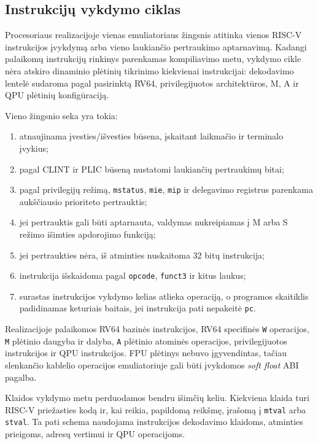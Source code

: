 \subsection{Instrukcijų vykdymo ciklas}
\label{sec:instrukciju-vykdymas}

Procesoriaus realizacijoje vienas emuliatoriaus žingsnis atitinka vienos RISC-V instrukcijos įvykdymą arba vieno laukiančio pertraukimo aptarnavimą. Kadangi palaikomų instrukcijų rinkinys parenkamas kompiliavimo metu, vykdymo cikle nėra atskiro dinaminio plėtinių tikrinimo kiekvienai instrukcijai: dekodavimo lentelė sudaroma pagal pasirinktą RV64, privilegijuotos architektūros, M, A ir QPU plėtinių konfigūraciją.

Vieno žingsnio seka yra tokia:

\begin{enumerate}
    \item atnaujinama įvesties/išvesties būsena, įskaitant laikmačio ir terminalo įvykius;
    \item pagal CLINT ir PLIC būseną nustatomi laukiančių pertraukimų bitai;
    \item pagal privilegijų režimą, \texttt{mstatus}, \texttt{mie}, \texttt{mip} ir delegavimo registrus parenkama aukščiausio prioriteto pertrauktis;
    \item jei pertrauktis gali būti aptarnauta, valdymas nukreipiamas į M arba S režimo išimties apdorojimo funkciją;
    \item jei pertraukties nėra, iš atminties nuskaitoma 32 bitų instrukcija;
    \item instrukcija išskaidoma pagal \texttt{opcode}, \texttt{funct3} ir kitus laukus;
    \item surastas instrukcijos vykdymo kelias atlieka operaciją, o programos skaitiklis padidinamas keturiais baitais, jei instrukcija pati nepakeitė \texttt{pc}.
\end{enumerate}

Realizacijoje palaikomos RV64 bazinės instrukcijos, RV64 specifinės \texttt{W} operacijos, \texttt{M} plėtinio daugyba ir dalyba, \texttt{A} plėtinio atominės operacijos, privilegijuotos instrukcijos ir QPU instrukcijos. FPU plėtinys nebuvo įgyvendintas, tačiau slenkančio kablelio operacijos emuliatoriuje gali būti įvykdomos \textit{soft float} ABI pagalba.

Klaidos vykdymo metu perduodamos bendru išimčių keliu. Kiekviena klaida turi RISC-V priežasties kodą ir, kai reikia, papildomą reikšmę, įrašomą į \texttt{mtval} arba \texttt{stval}. Ta pati schema naudojama instrukcijos dekodavimo klaidoms, atminties prieigoms, adresų vertimui ir QPU operacijoms.

